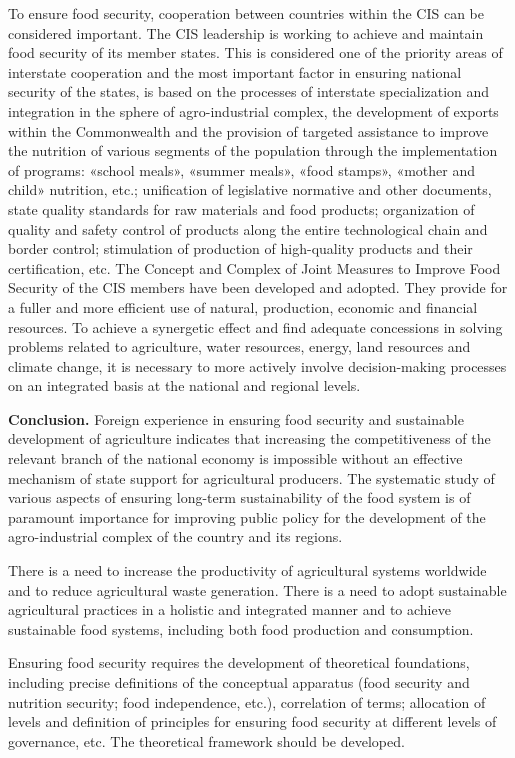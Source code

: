 \begin{multicols}{2}
To ensure food security, cooperation between countries within the CIS
can be considered important. The CIS leadership is working to achieve
and maintain food security of its member states. This is considered one
of the priority areas of interstate cooperation and the most important
factor in ensuring national security of the states, is based on the
processes of interstate specialization and integration in the sphere of
agro-industrial complex, the development of exports within the
Commonwealth and the provision of targeted assistance to improve the
nutrition of various segments of the population through the
implementation of programs: «school meals», «summer meals», «food
stamps», «mother and child» nutrition, etc.; unification of legislative
normative and other documents, state quality standards for raw materials
and food products; organization of quality and safety control of
products along the entire technological chain and border control;
stimulation of production of high-quality products and their
certification, etc. The Concept and Complex of Joint Measures to Improve
Food Security of the CIS members have been developed and adopted. They
provide for a fuller and more efficient use of natural, production,
economic and financial resources. To achieve a synergetic effect and
find adequate concessions in solving problems related to agriculture,
water resources, energy, land resources and climate change, it is
necessary to more actively involve decision-making processes on an
integrated basis at the national and regional levels.

{\bfseries Conclusion.} Foreign experience in ensuring food security and
sustainable development of agriculture indicates that increasing the
competitiveness of the relevant branch of the national economy is
impossible without an effective mechanism of state support for
agricultural producers. The systematic study of various aspects of
ensuring long-term sustainability of the food system is of paramount
importance for improving public policy for the development of the
agro-industrial complex of the country and its regions.

There is a need to increase the productivity of agricultural systems
worldwide and to reduce agricultural waste generation. There is a need
to adopt sustainable agricultural practices in a holistic and integrated
manner and to achieve sustainable food systems, including both food
production and consumption.

Ensuring food security requires the development of theoretical
foundations, including precise definitions of the conceptual apparatus
(food security and nutrition security; food independence, etc.),
correlation of terms; allocation of levels and definition of principles
for ensuring food security at different levels of governance, etc. The
theoretical framework should be developed.


\end{multicols}

